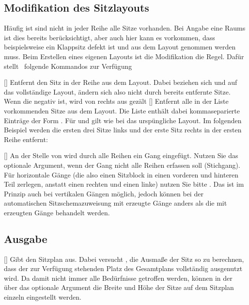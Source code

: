 \documentclass[
babel-options={ngerman},
load-preamble-,
scrartcl={headings=small}
]{cnltx-doc}
\providecommand{\packagename}{tucseating}
\def\thepkg{\pkg*{\packagename}}
\begin{document}
\subsection{Modifikation des Sitzlayouts}
\label{sec:modify-layout}
Häufig ist sind nicht in jeder Reihe alle Sitze vorhanden.
Bei Angabe eine Raums ist dies bereits berücksichtigt, aber auch hier kann es
vorkommen, dass beispielsweise ein Klappsitz defekt ist und aus dem Layout
genommen werden muss.
Beim Erstellen eines eigenen Layouts ist die Modifikation die Regel.
Dafür stellt \pkg\ folgende Kommandos zur Verfügung
\begin{commands}
  []
  Entfernt den Sitz  in der Reihe  aus dem
  Layout. Dabei beziehen sich  und  auf das
  vollständige Layout, ändern sich also nicht durch bereits entfernte Sitze.
  Wenn die  negativ ist, wird von rechts aus gezält
  []
  Entfernt alle in der Liste vorkommenden Sitze aus dem Layout. Die Liste enthält
  dabei kommaseparierte Einträge der Form
  . Für  und
   gilt wie bei  das urspüngliche Layout.
  Im folgenden Beispiel werden die ersten drei Sitze links und der erste Sitz
  rechts in der ersten Reihe entfernt:
  \begin{example}
  \end{example}\vspace{-1.3\baselineskip}
  []
  An der Stelle von  wird durch alle Reihen ein Gang eingefügt. Nutzen Sie das
  optionale Argument, wenn der Gang nicht alle Reihen erfassen soll (Stichgang).
  Für horizontale Gänge (die also einen Sitzblock in einen vorderen und hinteren
  Teil zerlegen, anstatt einen rechten und einen linke) nutzen Sie bitte
  .
  Das ist im Prinzip auch bei vertikalen Gängen möglich, jedoch können bei der automatischen
  Sitzschemazuweisung mit  erzeugte Gänge anders als die mit
   erzeugten Gänge behandelt werden.
\end{commands}

\subsection{Ausgabe}
\label{sec:drawing}
\begin{commands}
  
  [\sarg{}]\Default
  Gibt den Sitzplan aus. Dabei versucht \thepkg, die Ausmaße der Sitz so zu
  berechnen, dass der zur Verfügung stehenden Platz des Gesamtplans vollständig
  ausgenutzt wird.
  Da damit nicht immer alle Bedürfnisse getroffen werden, können in der
  über das optionale Argument die Breite und Höhe der Sitze auf
  dem Sitzplan einzeln eingestellt werden.
\end{commands}
\end{document}
